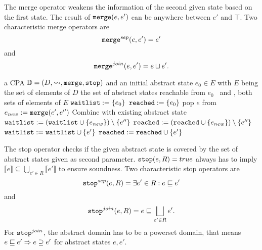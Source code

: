 The merge operator weakens the information of the second given state based on the first state. The result of $\texttt{merge}(e, e')$ can be anywhere between $e'$ and $\top$.
Two characteristic merge operators are \[\texttt{merge}^{sep}(e, e') = e'\] and \[\texttt{merge}^{join}(e, e') = e \sqcup e'.\]
\begin{algorithm}[t]
\caption{$CPA(\cpa, e_0)$}
\label{alg:CPA}
\begin{algorithmic}[1]

\Input a CPA $\mathbb{D} = (D, \rightsquigarrow, \texttt{merge}, \texttt{stop})$ 
	    and an initial abstract state $e_0 \in E$ with $E$ being the set of elements of $D$
\Output the set of abstract states reachable from $e_0$
\Variables \reachedSet\ and \waitlistSet , both sets of elements of $E$
\State $\texttt{waitlist} := \{e_0\}$
\State $\texttt{reached} := \{e_0\}$
\While{$\waitlistSet \neq \varnothing$}
	\State pop $e$ from \waitlistSet
		 \label{alg:cpa:mergeStart}
			\State $e_{new} := \texttt{merge}(e', e'')$ \Comment Combine with existing abstract state
				\State $\texttt{waitlist} := (\texttt{waitlist} \cup \{ e_{new} \}) \setminus \{ e'' \}$
				\State $\texttt{reached} := (\texttt{reached} \cup \{ e_{new} \}) \setminus \{ e'' \}$
			\EndIf
		\EndFor \label{alg:cpa:mergeStop}
		 \label{alg:cpa:stopCheck}
			\State $\texttt{waitlist} := \texttt{waitlist} \cup \{e'\}$
			\State $\texttt{reached} := \texttt{reached} \cup \{e'\}$
		\EndIf
	\EndFor
\EndWhile\\ 
\Return \reachedSet
\end{algorithmic}
\end{algorithm}

The stop operator checks if the given abstract state is covered by the set of abstract states given as second parameter.
$\texttt{stop}(e, R) = true$ always has to imply $\llbracket e \rrbracket \subseteq \bigcup_{e' \in R} \llbracket e' \rrbracket$ to ensure soundness.
Two characteristic stop operators are \[\texttt{stop}^{sep}(e, R) = \exists e' \in R : e \sqsubseteq e'\] and \[\texttt{stop}^{join}(e, R) = e \sqsubseteq \bigsqcup\limits_{e' \in R} e'.\]
For $\texttt{stop}^{join}$, the abstract domain has to be a powerset domain, that means $e \sqsubseteq e' \Rightarrow e \supseteq e'$ for abstract states $e, e'$.

